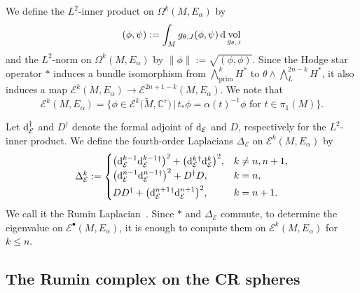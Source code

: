 \documentclass[pdftex]{sigma}
\numberwithin{equation}{section}
\DeclareMathOperator{\vol}{vol}
\DeclareMathOperator{\prim}{prim}
\newcommand{\adjoint}{\dagger}
\newcommand{\RN}{\cE}
\newcommand{\bC}{\mathbb{C}}
\newcommand{\cE}{\mathcal{E}}
\begin{document}
We define the $L^2$-inner product on $\Omega^{k} (M,E_{\alpha})$ by
\[
(\phi , \psi ) := \int_M g_{\theta , J} (\phi , \psi )\, {\rm d}\vol_{g_{\theta , J}}
\]
and the $L^2$-norm on $\Omega^k (M,E_{\alpha})$ by $\| \phi \| := \sqrt{(\phi , \phi )}$.
Since the Hodge star operator $*$ induces a bundle isomorphism
from $ \textstyle \bigwedge_{\prim}^{k} H^*$ %
to $\theta \wedge \textstyle \bigwedge_{L}^{2n-k} H^*$,
it also induces a map $\cE ^{k} (M,E_{\alpha} ) \to \cE ^{2n+1-k} (M,E_{\alpha}) $.
We note that
\[
 \cE^k ( M , E_{\alpha})
 =
 \big\{
 \phi \in \cE^k \big( \widetilde M , \bC^r \big)
 \, | \,
 t_* \phi = \alpha (t)^{-1} \phi \text{ for } t \in \pi_1 (M)
 \big\}
 .
\]

Let ${\rm d}_\RN ^{\adjoint }$ and $D^{\adjoint }$ denote the formal adjoint of ${\rm d}_\RN $ and $D$, respectively for the $L^2$-inner product.
We define the fourth-order Laplacians $\Delta_\RN $ on $\cE ^k (M,E_{\alpha} )$ by
\[
\Delta_\RN ^k
 :=
\begin{cases}
\big( {\rm d}_\RN ^{k-1} {\rm d}_\RN ^{k-1} {}^{\adjoint }\big)^2 + \big({\rm d}_\RN ^{k} {}^{\adjoint } {\rm d}_\RN ^{k} \big)^2 , & k \not = n , n+1 , \\
\vspace{1mm}
\big( {\rm d}_\RN ^{n-1} {\rm d}_\RN ^{n-1} {}^{\adjoint }\big)^2 + D^{\adjoint } D , & k=n, \\
D D^{\adjoint } + \big({\rm d}_\RN ^{n+1} {}^{\adjoint } {\rm d}_\RN ^{n+1} \big)^2 , & k =n+1.
\end{cases}
\]
We call it the Rumin Laplacian~\cite{Rumin-94}.
Since $*$ and $\Delta_\RN $ commute,
to determine the eigenvalue on $\cE ^\bullet (M,E_{\alpha} ) $,
it is enough to compute them on $\cE ^{k } (M,E_{\alpha})$ for $k \leq n$.


\subsection{The Rumin complex on the CR spheres}
\end{document}
